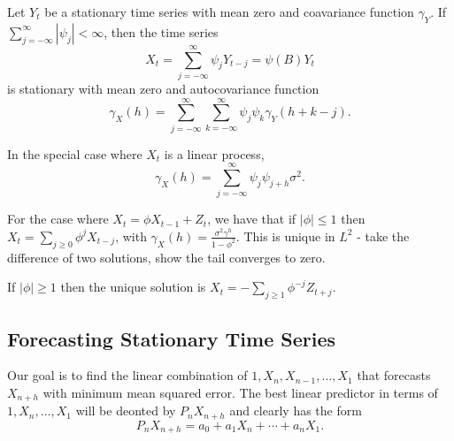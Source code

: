 \begin{proposition}
  Let $Y_{t}$ be a stationary time series with mean zero and
  coavariance function $\gamma_{Y}$.  If $\sum_{j=-\infty}^{\infty}
  |\psi_{j}| < \infty$, then the time series
  \begin{equation}
    \label{eq:9}
    X_{t} = \sum_{j=-\infty}^{\infty} \psi_{j} Y_{t-j} = \psi(B) Y_{t}
  \end{equation}
  is stationary with mean zero and autocovariance function
  \begin{equation}
    \gamma_{X}(h) = \sum_{j=-\infty}^{\infty}
    \sum_{k=-\infty}^{\infty} \psi_{j}\psi_{k} \gamma_{Y}(h + k - j).
  \end{equation}

  In the special case where $X_{t}$ is a linear process,
  \begin{equation}
    \gamma_{X}(h) = \sum_{j=-\infty}^{\infty} \psi_{j} \psi_{j + h} \sigma^{2}.
  \end{equation}
\end{proposition}

\begin{thm}
  For the case where $X_{t} = \phi X_{t-1} + Z_{t}$, we have that if
  $|\phi| \leq 1$ then $X_{t} = \sum_{j \geq 0}^{} \phi^{j} X_{t-j}$,
  with $\gamma_{X}(h) = \frac{\sigma^{2} \gamma^{h}}{1 - \phi^{2}}$.
  This is unique in $L^{2}$ - take the difference of two solutions,
  show the tail converges to zero.

  If $|\phi| \geq 1$ then the unique solution is $X_{t} = -\sum_{j
    \geq 1}^{} \phi^{-j} Z_{t+j}$.
\end{thm}

\subsection{Forecasting Stationary Time Series}
\label{sec:forec-stat-time}

Our goal is to find the linear combination of $1, X_{n}, X_{n-1},
\dots, X_{1}$ that forecasts $X_{n+h}$ with minimum mean squared
error.  The best linear predictor in terms of $1, X_{n}, \dots, X_{1}$
will be deonted by $P_{n} X_{n+h}$ and clearly has the form
\begin{equation}
  P_{n}X_{n+h} = a_{0} + a_{1} X_{n} + \cdots + a_{n} X_{1}.
\end{equation}

